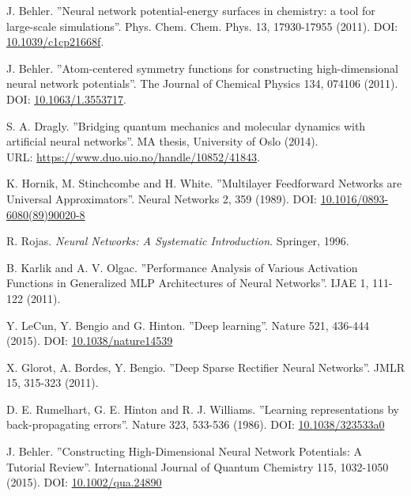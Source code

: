 \documentclass[twoside,english]{uiofysmaster}
\begin{document}
\begin{thebibliography}{56}

 J. Behler.
 ''Neural network potential-energy surfaces in chemistry: a tool for large-scale simulations''.
 Phys. Chem. Chem. Phys. 13, 17930-17955 (2011). 
 DOI: \href{http://dx.doi.org/10.1039/c1cp21668f}{10.1039/c1cp21668f}. 
 
 J. Behler.
 ''Atom-centered symmetry functions for constructing high-dimensional neural network potentials''.
 The Journal of Chemical Physics 134, 074106 (2011). 
 DOI: \href{http://dx.doi.org/10.1063/1.3553717}{10.1063/1.3553717}.
 
 S. A. Dragly.
 ''Bridging quantum mechanics and molecular dynamics with artificial neural networks''.
 MA thesis, University of Oslo (2014). \\
 URL: \href{https://www.duo.uio.no/handle/10852/41843}{https://www.duo.uio.no/handle/10852/41843}.

 K. Hornik, M. Stinchcombe and H. White.
 ''Multilayer Feedforward Networks are Universal Approximators''.
 Neural Networks 2, 359 (1989). 
 DOI: \href{https://doi.org/10.1016/0893-6080(89)90020-8}{10.1016/0893-6080(89)90020-8}
 
 R. Rojas. 
 \textit{Neural Networks: A Systematic Introduction}.
 Springer, 1996.
 
 B. Karlik and A. V. Olgac.
 ''Performance Analysis of Various Activation Functions in Generalized MLP Architectures of Neural Networks''.
 IJAE 1, 111-122 (2011).
 
 Y. LeCun, Y. Bengio and G. Hinton.
 ''Deep learning''.
 Nature 521, 436-444 (2015). 
 DOI: \href{http://dx.doi.org/10.1038/nature14539}{10.1038/nature14539}
 
 X. Glorot, A. Bordes, Y. Bengio.
 ''Deep Sparse Rectifier Neural Networks''.
 JMLR 15, 315-323 (2011).
 
 D. E. Rumelhart, G. E. Hinton and R. J. Williams.
 ''Learning representations by back-propagating errors''.
 Nature 323, 533-536 (1986).
 DOI: \href{http://dx.doi.org/10.1038/323533a0}{10.1038/323533a0}
 
 J. Behler.
 ''Constructing High-Dimensional Neural Network Potentials: A Tutorial Review''.
 International Journal of Quantum Chemistry 115, 1032-1050 (2015).
 DOI: \href{http://dx.doi.org/10.1002/qua.24890}{10.1002/qua.24890}
 

\end{thebibliography}
\end{document}
